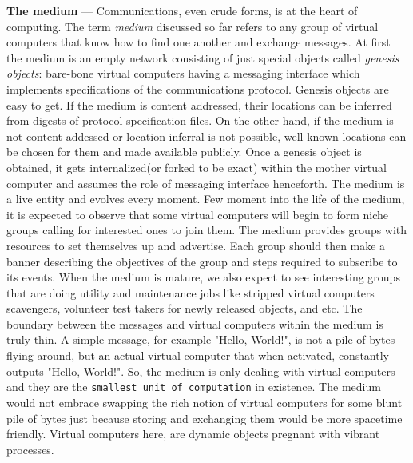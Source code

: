 \documentclass[a4paper, 10pt]{article}
\begin{document}
\textbf{The medium} --- Communications, even crude forms, is at the heart of computing. The term \textit{medium} discussed so far refers to any group of virtual computers that know how to find one another and exchange messages. At first the medium is an empty network consisting of just special objects called \textit{genesis objects}: bare-bone virtual computers having a messaging interface which implements specifications of the communications protocol. Genesis objects are easy to get. If the medium is content addressed, their locations can be inferred from digests of protocol specification files. On the other hand, if the medium is not content addessed or location inferral is not possible, well-known locations can be chosen for them and made available publicly. Once a genesis object is obtained, it gets internalized(or forked to be exact) within the mother virtual computer and assumes the role of messaging interface henceforth. The medium is a live entity and evolves every moment. Few moment into the life of the medium, it is expected to observe that some virtual computers will begin to form niche groups calling for interested ones to join them. The medium provides groups with resources to set themselves up and advertise. Each group should then make a banner describing the objectives of the group and steps required to subscribe to its events. When the medium is mature, we also expect to see interesting groups that are doing utility and maintenance jobs like stripped virtual computers scavengers, volunteer test takers for newly released objects, and etc. The boundary between the messages and virtual computers within the medium is truly thin. A simple message, for example "Hello, World!", is not a pile of bytes flying around, but an actual virtual computer that when activated, constantly outputs "Hello, World!". So, the medium is only dealing with virtual computers and they are the \texttt{smallest unit of computation} in existence. The medium would not embrace swapping the rich notion of virtual computers for some blunt pile of bytes just because storing and exchanging them would be more spacetime friendly. Virtual computers here, are dynamic objects pregnant with vibrant processes. 
\par
\end{document}
